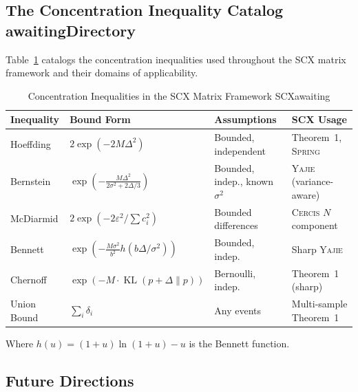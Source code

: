 \documentclass[12pt,a4paper]{article}
\theoremstyle{definition}
\newcommand{\Yajie}{\textsc{Yajie}}
\newcommand{\Spring}{\textsc{Spring}}
\newcommand{\Cercis}{\textsc{Cercis}}
\newcommand{\SCX}{\textsc{SCX}}
\DeclareMathOperator{\KL}{KL}
\begin{document}
\subsection{The Concentration Inequality Catalog awaitingDirectory}

Table~\ref{tab:concentration_catalog} catalogs the concentration inequalities used 
throughout the \SCX{} matrix framework and their domains of applicability.

\begin{table}[htbp]
\centering
\caption{Concentration Inequalities in the SCX Matrix Framework SCXawaiting}
\label{tab:concentration_catalog}
\begin{tabular}{@{}p{2.5cm}p{3cm}p{2.5cm}p{4cm}@{}}
\toprule
\textbf{Inequality} & \textbf{Bound Form} & \textbf{Assumptions} & \textbf{SCX Usage} \\
\midrule
Hoeffding & $2\exp(-2M\Delta^2)$ & Bounded, independent & Theorem~1, \Spring{} \\
Bernstein & $\exp\!\left(-\frac{M\Delta^2}{2\sigma^2 + 2\Delta/3}\right)$ & Bounded, indep., known $\sigma^2$ & \Yajie{} (variance-aware) \\
McDiarmid & $2\exp(-2\varepsilon^2/\sum c_i^2)$ & Bounded differences & \Cercis{} $N$ component \\
Bennett & $\exp\!\left(-\frac{M\sigma^2}{b^2}h(b\Delta/\sigma^2)\right)$ & Bounded, indep. & Sharp \Yajie{} \\
Chernoff & $\exp(-M \cdot \KL(p+\Delta\|p))$ & Bernoulli, indep. & Theorem~1 (sharp) \\
Union Bound & $\sum_i \delta_i$ & Any events & Multi-sample Theorem~1 \\
\bottomrule
\end{tabular}
\end{table}

Where $h(u) = (1+u)\ln(1+u) - u$ is the Bennett function.

\subsection{Future Directions }
\end{document}
